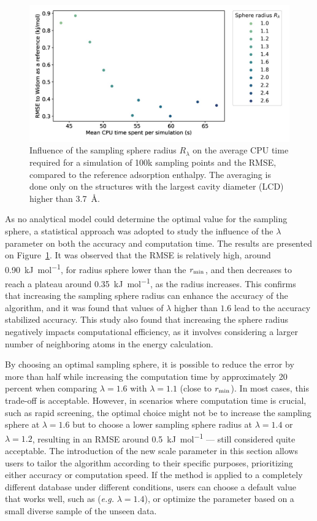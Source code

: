 \documentclass[main]{subfiles}
\begin{document}
\begin{figure}[ht]
\centering
  \includegraphics[width=0.7\linewidth]{figures/3-fastsim/sphere_size_optimisation.jpg}
  \caption{Influence of the sampling sphere radius $R_{\lambda}$ on the average CPU time required for a simulation of 100k sampling points and the RMSE, compared to the reference adsorption enthalpy. The averaging is done only on the structures with the largest cavity diameter (LCD) higher than \SI{3.7}{\angstrom}.}\label{fgr:radius}
\end{figure}

As no analytical model could determine the optimal value for the sampling sphere, a statistical approach was adopted to study the influence of the $\lambda$ parameter on both the accuracy and computation time. The results are presented on Figure~\ref{fgr:radius}. It was observed that the RMSE is relatively high, around \SI{0.90}{\kilo\joule\per\mole}, for radius sphere lower than the $r_{\text{min}}$, and then decreases to reach a plateau around \SI{0.35}{\kilo\joule\per\mole}, as the radius increases. This confirms that increasing the sampling sphere radius can enhance the accuracy of the algorithm, and it was found that values of $\lambda$ higher than $1.6$ lead to the accuracy stabilized accuracy. This study also found that increasing the sphere radius negatively impacts computational efficiency, as it involves considering a larger number of neighboring atoms in the energy calculation.

By choosing an optimal sampling sphere, it is possible to reduce the error by more than half while increasing the computation time by approximately 20 percent when comparing $\lambda=1.6$ with $\lambda=1.1$ (close to $r_{\text{min}}$). In most cases, this trade-off is acceptable. However, in scenarios where computation time is crucial, such as rapid screening, the optimal choice might not be to increase the sampling sphere at $\lambda=1.6$ but to choose a lower sampling sphere radius at $\lambda=1.4$ or $\lambda=1.2$, resulting in an RMSE around \SI{0.5}{\kilo\joule\per\mole} --- still considered quite acceptable. The introduction of the new scale parameter in this section allows users to tailor the algorithm according to their specific purposes, prioritizing either accuracy or computation speed. {If the method is applied to a completely different database under different conditions, users can choose a default value that works well, such as (\emph{e.g.} $\lambda=1.4$), or optimize the parameter based on a small diverse sample of the unseen data.}
\end{document}
